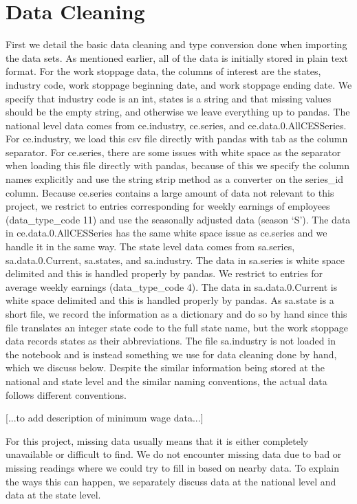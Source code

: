 \documentclass[reqno,11pt]{amsart}
\begin{document}
\section{Data Cleaning}

First we detail the basic data cleaning and type conversion done when importing the
data sets. As mentioned earlier, all of the data is initially stored in plain text format.
For the work stoppage data, the columns of interest are the states, industry code,
work stoppage beginning date, and work stoppage ending date. We specify that industry code
is an int, states is a string and that missing values should be the empty string,
and otherwise we leave everything up to pandas. The national level data comes 
from ce.industry, ce.series, and ce.data.0.AllCESSeries.
For ce.industry, we load this csv file directly with pandas with tab as the column separator.
For ce.series, there are some issues with white space as the separator
when loading this file directly with pandas, because of this we specify the column names 
explicitly and use the string strip method as a converter on the series\_id column.
Because ce.series contains a large amount of data not relevant to this project, we
restrict to entries corresponding for weekly earnings of employees (data\_type\_code 11)
and use the seasonally adjusted data (season `S'). The data in 
ce.data.0.AllCESSeries has the same white space issue as ce.series and we handle it in the same way.
The state level data comes from sa.series, sa.data.0.Current, sa.states, and sa.industry.
The data in sa.series is white space delimited and this is handled properly by pandas.
We restrict to entries for average weekly earnings (data\_type\_code 4).
The data in sa.data.0.Current is white space delimited and this is handled properly by pandas.
As sa.state is a short file, we record the information as a dictionary and do so by hand
since this file translates an integer state code to the full state name, but the work
stoppage data records states as their abbreviations. The file sa.industry is not loaded
in the notebook and is instead something we use for data cleaning done by hand, which
we discuss below. Despite the similar information being stored at the national and 
state level and the similar naming conventions, the actual data follows different conventions. 

[...to add description of minimum wage data...]


For this project, missing data usually means that it is either completely unavailable
or difficult to find. We do not encounter missing data due to bad or missing readings
where we could try to fill in based on nearby data. To explain the ways this can happen, 
we separately discuss data at the national level and data at the state level.
\end{document}
